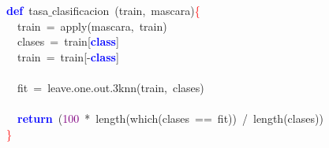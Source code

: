 \noindent
\mbox{}\textbf{\textcolor{Blue}{def}}\ tasa$\_$clasificacion\ \textcolor{BrickRed}{(}train\textcolor{BrickRed}{,}\ mascara\textcolor{BrickRed}{)}\textcolor{Red}{\{} \\
\mbox{}\ \ train\ \textcolor{BrickRed}{=}\ apply\textcolor{BrickRed}{(}mascara\textcolor{BrickRed}{,}\ train\textcolor{BrickRed}{)} \\
\mbox{}\ \ clases\ \textcolor{BrickRed}{=}\ train\textcolor{BrickRed}{[}\textbf{\textcolor{Blue}{class}}\textcolor{BrickRed}{]} \\
\mbox{}\ \ train\ \textcolor{BrickRed}{=}\ train\textcolor{BrickRed}{[-}\textbf{\textcolor{Blue}{class}}\textcolor{BrickRed}{]} \\
\mbox{} \\
\mbox{}\ \ fit\ \textcolor{BrickRed}{=}\ leave\textcolor{BrickRed}{.}one\textcolor{BrickRed}{.}out\textcolor{BrickRed}{.}3knn\textcolor{BrickRed}{(}train\textcolor{BrickRed}{,}\ clases\textcolor{BrickRed}{)} \\
\mbox{} \\
\mbox{}\ \ \textbf{\textcolor{Blue}{return}}\ \textcolor{BrickRed}{(}\textcolor{Purple}{100}\ \textcolor{BrickRed}{*}\ length\textcolor{BrickRed}{(}which\textcolor{BrickRed}{(}clases\ \textcolor{BrickRed}{==}\ fit\textcolor{BrickRed}{))}\ \textcolor{BrickRed}{/}\ length\textcolor{BrickRed}{(}clases\textcolor{BrickRed}{))} \\
\mbox{}\textcolor{Red}{\}} \\
\mbox{}
